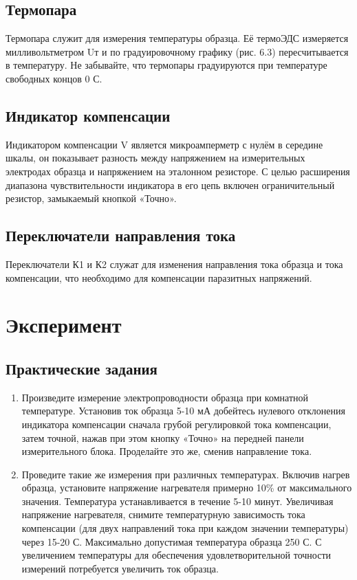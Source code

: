 \subsection{Термопара}
Термопара служит для измерения температуры образца. Её термоЭДС измеряется милливольтметром Uт и по градуировочному графику (рис. 6.3) пересчитывается в температуру. Не забывайте, что термопары градуируются при температуре свободных концов 0 С.

\subsection{Индикатор компенсации}
Индикатором компенсации V является микроамперметр с нулём в середине шкалы, он показывает разность между напряжением на измерительных электродах образца и напряжением на эталонном резисторе. С целью расширения диапазона чувствительности индикатора в его цепь включен ограничительный резистор, замыкаемый кнопкой «Точно».

\subsection{Переключатели направления тока}
Переключатели К1 и К2 служат для изменения направления тока образца и тока компенсации, что необходимо для компенсации паразитных напряжений.

\section*{Эксперимент}
\subsection*{Практические задания}

\begin{enumerate}
	\item Произведите измерение электропроводности образца при комнатной температуре. Установив ток образца 5-10 мА добейтесь нулевого отклонения индикатора компенсации сначала грубой регулировкой тока компенсации, затем точной, нажав при этом кнопку «Точно» на передней панели измерительного блока. Проделайте это же, сменив направление тока.
	\item Проведите такие же измерения при различных температурах. Включив нагрев образца, установите напряжение нагревателя примерно 10\% от максимального значения. Температура устанавливается в течение 5-10 минут. Увеличивая напряжение нагревателя, снимите температурную зависимость тока компенсации (для двух направлений тока при каждом значении температуры) через 15-20 С. Максимально допустимая температура образца 250 С.
	С увеличением температуры для обеспечения удовлетворительной точности измерений потребуется увеличить ток образца.
\end{enumerate} 


